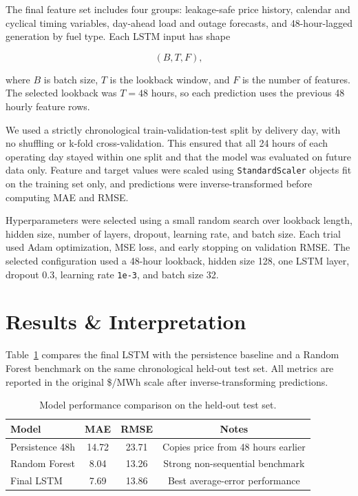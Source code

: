 \documentclass{article}
\begin{document}
The final feature set includes four groups: leakage-safe price history, calendar and cyclical timing variables, day-ahead load and outage forecasts, and 48-hour-lagged generation by fuel type. Each LSTM input has shape

\[
(B, T, F),
\]

where $B$ is batch size, $T$ is the lookback window, and $F$ is the number of features. The selected lookback was $T=48$ hours, so each prediction uses the previous 48 hourly feature rows.

We used a strictly chronological train-validation-test split by delivery day, with no shuffling or k-fold cross-validation. This ensured that all 24 hours of each operating day stayed within one split and that the model was evaluated on future data only. Feature and target values were scaled using \texttt{StandardScaler} objects fit on the training set only, and predictions were inverse-transformed before computing MAE and RMSE.

Hyperparameters were selected using a small random search over lookback length, hidden size, number of layers, dropout, learning rate, and batch size. Each trial used Adam optimization, MSE loss, and early stopping on validation RMSE. The selected configuration used a 48-hour lookback, hidden size 128, one LSTM layer, dropout 0.3, learning rate \texttt{1e-3}, and batch size 32.

\FloatBarrier
\section{Results \& Interpretation}

Table~\ref{tab:model-results} compares the final LSTM with the persistence baseline and a Random Forest benchmark on the same chronological held-out test set. All metrics are reported in the original \$/MWh scale after inverse-transforming predictions.

\begin{table}[h]
  \caption{Model performance comparison on the held-out test set.}
  \label{tab:model-results}
  \centering
  \begin{tabular}{lccc}
    \toprule
    Model & MAE & RMSE & Notes \\
    \midrule
     Persistence 48h & 14.72 & 23.71 & Copies price from 48 hours earlier \\
    Random Forest & 8.04 & 13.26 & Strong non-sequential benchmark \\
    Final LSTM & 7.69 & 13.86 & Best average-error performance \\
    \bottomrule
  \end{tabular}
\end{table}
\end{document}

